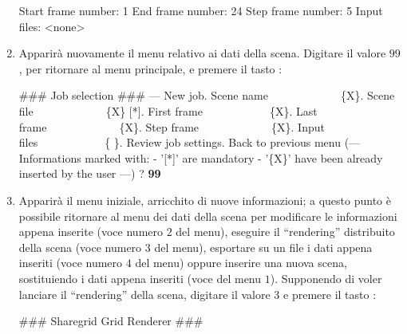\begin{enumerate}
\begin{mgCodeBox}
Start frame number: 1\newline
End frame number: 24\newline
Step frame number: 5\newline
Input files:  <none>\newline
\end{mgCodeBox}
\item Apparir\`a nuovamente il menu relativo ai dati della scena. Digitare il valore $99$, per ritornare al menu principale, e premere il tasto :
\begin{mgCodeBox}
\small
\#\#\# Job selection \#\#\#\newline
--- New job. Scene name\ \ \ \ \ \ \ \ \ \ \ \ \ \{X\}. Scene file\ \ \ \ \ \ \ \ \ \ \ \ \ \{X\} [*]. First frame\ \ \ \ \ \ \ \ \ \ \ \ \{X\}. Last frame\ \ \ \ \ \ \ \ \ \ \ \ \ \{X\}. Step frame\ \ \ \ \ \ \ \ \ \ \ \ \ \{X\}. Input files\ \ \ \ \ \ \ \ \ \ \ \ \{ \}. Review job settings. Back to previous menu\newline
(---\newline
 Informations marked with:\newline
 - '[*]' are mandatory\newline
 - '\{X\}' have been already inserted by the user\newline
---)\newline
? \textbf{99}
\end{mgCodeBox}
\item Apparir\`a il menu iniziale, arricchito di nuove informazioni; a questo punto \`e possibile ritornare al menu dei dati della scena per modificare le informazioni appena inserite (voce numero $2$ del menu), eseguire il ``rendering'' distribuito della scena (voce numero $3$ del menu), esportare su un file i dati appena inseriti (voce numero $4$ del menu) oppure inserire una nuova scena, sostituiendo i dati appena inseriti (voce del menu $1$).
Supponendo di voler lanciare il ``rendering'' della scena, digitare il valore $3$ e premere il tasto :
\begin{mgCodeBox}
\small
\#\#\# Sharegrid Grid Renderer \#\#\#\newline

\end{mgCodeBox}
\end{enumerate}
